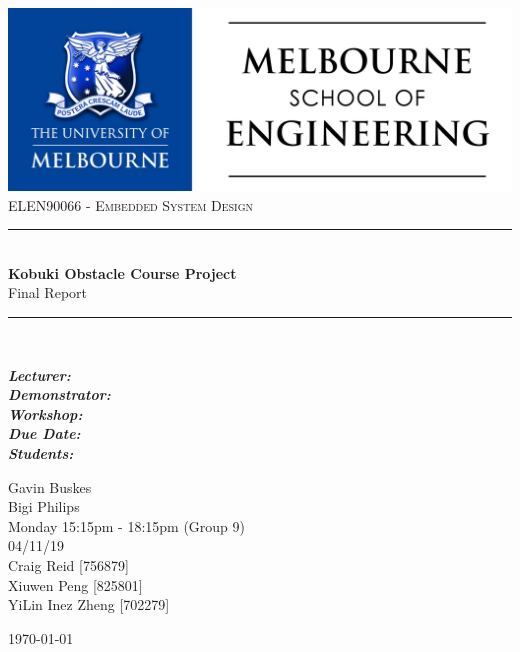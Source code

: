 \begin{titlepage}

\newcommand{\HRule}{\rule{\linewidth}{0.5mm}}

\begin{center}
\includegraphics[width=\textwidth]{Images/MSE.jpg}\\[1cm]  
\textsc{\Large ELEN90066 - Embedded System Design}\\[0.5cm]
\HRule \\[0.4cm]
{\bfseries Kobuki Obstacle Course Project}\\[0.4cm]

\large{Final Report}
\HRule \\[2cm]


\begin{minipage}{0.45\textwidth}
\begin{flushleft} \large
\emph{\textbf{Lecturer:}}\\[0.2cm]
\emph{\textbf{Demonstrator:}}\\[0.2cm]
\emph{\textbf{Workshop:}}\\[0.2cm]
\emph{\textbf{Due Date:}}\\[0.2cm]
\emph{\textbf{Students:}}\\[0.2cm]
\vspace{1.3cm}
\end{flushleft}
\end{minipage}
\begin{minipage}{0.45\textwidth}
\begin{flushright} \large
Gavin Buskes \\[0.2cm]
Bigi Philips \\[0.2cm]
Monday 15:15pm - 18:15pm (Group 9)\\[0.2cm]
04/11/19\\[0.2cm]
Craig Reid [756879]\\[0.2cm] 
Xiuwen Peng [825801]\\[0.2cm]
YiLin Inez Zheng [702279]
\end{flushright}
\end{minipage}
\vfill
{\large \today}
\end{center}
\end{titlepage}